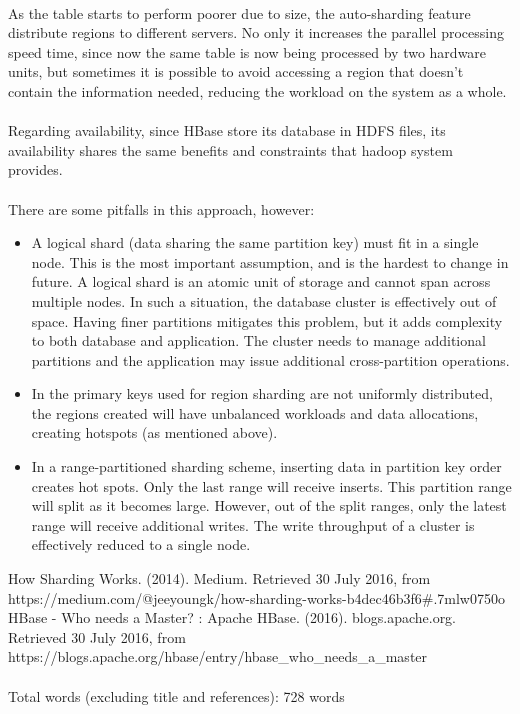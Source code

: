 \documentclass[11pt, a4paper]{article}
\begin{document}
\paragraph{}As the table starts to perform poorer due to size, the auto-sharding feature distribute regions to different servers. No only it increases the parallel processing speed time, since now the same table is now being processed by two hardware units, but sometimes it is possible to avoid accessing a region that doesn't contain the information needed, reducing the workload on the system as a whole.
\paragraph{}Regarding availability, since HBase store its database in HDFS files, its availability shares the same benefits and constraints that hadoop system provides.

\paragraph{}There are some pitfalls in this approach, however:
\begin{itemize}
	\item A logical shard (data sharing the same partition key) must fit in a single node. This is the most important assumption, and is the hardest to change in future. A logical shard is an atomic unit of storage and cannot span across multiple nodes. In such a situation, the database cluster is effectively out of space. Having finer partitions mitigates this problem, but it adds complexity to both database and application. The cluster needs to manage additional partitions and the application may issue additional cross-partition operations.
	\item In the primary keys used for region sharding are not uniformly distributed, the regions created will have unbalanced workloads and data allocations, creating hotspots (as mentioned above).
	\item In a range-partitioned sharding scheme, inserting data in partition key order creates hot spots. Only the last range will receive inserts. This partition range will split as it becomes large. However, out of the split ranges, only the latest range will receive additional writes. The write throughput of a cluster is effectively reduced to a single node.
\end{itemize}


\begin{thebibliography}{1}
How Sharding Works. (2014). Medium. Retrieved 30 July 2016, from https://medium.com/@jeeyoungk/how-sharding-works-b4dec46b3f6\#.7mlw0750o
HBase - Who needs a Master? : Apache HBase. (2016). blogs.apache.org. Retrieved 30 July 2016, from https://blogs.apache.org/hbase/entry/hbase\_who\_needs\_a\_master

\end{thebibliography}

\paragraph{} Total words (excluding title and references): 728 words
\end{document}
